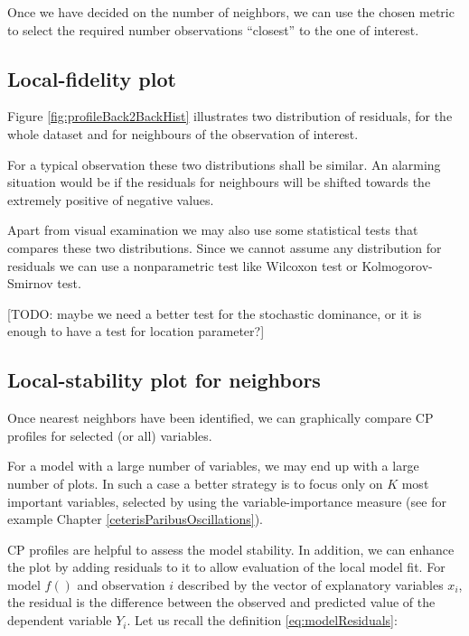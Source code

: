 \documentclass[]{krantz}
\begin{document}
Once we have decided on the number of neighbors, we can use the chosen metric to select the required number observations ``closest'' to the one of interest.

\hypertarget{cPLocDiagLFplot}{%
\subsection{Local-fidelity plot}\label{cPLocDiagLFplot}}

Figure \ref{fig:profileBack2BackHist} illustrates two distribution of residuals, for the whole dataset and for neighbours of the observation of interest.

For a typical observation these two distributions shall be similar. An alarming situation would be if the residuals for neighbours will be shifted towards the extremely positive of negative values.

Apart from visual examination we may also use some statistical tests that compares these two distributions. Since we cannot assume any distribution for residuals we can use a nonparametric test like Wilcoxon test or Kolmogorov-Smirnov test.

{[}TODO: maybe we need a better test for the stochastic dominance, or it is enough to have a test for location parameter?{]}

\hypertarget{cPLocDiagProfiles}{%
\subsection{Local-stability plot for neighbors}\label{cPLocDiagProfiles}}

Once nearest neighbors have been identified, we can graphically compare CP profiles for selected (or all) variables.

For a model with a large number of variables, we may end up with a large number of plots. In such a case a better strategy is to focus only on \(K\) most important variables, selected by using the variable-importance measure (see for example Chapter \ref{ceterisParibusOscillations}).

CP profiles are helpful to assess the model stability. In addition, we can enhance the plot by adding residuals to it to allow evaluation of the local model fit. For model \(f()\) and observation \(i\) described by the vector of explanatory variables \(x_i\), the residual is the difference between the observed and predicted value of the dependent variable \(Y_i\). Let us recall the definition \eqref{eq:modelResiduals}:
\end{document}
